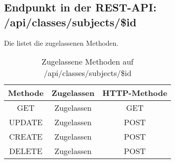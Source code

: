 \subsection{Endpunkt in der REST-API: /api/classes/subjects/\$id}
Die  listet die zugelassenen Methoden. 

\begin{table}[!htbp]
	\begin{tabular}{|c|c|c|}
		\hline
			\textbf{Methode} & \textbf{Zugelassen} & \textbf{HTTP-Methode} \\ \hline
			GET & Zugelassen & GET \\ \hline
			UPDATE & Zugelassen & POST \\ \hline 
			CREATE & Zugelassen & POST \\ \hline 
			DELETE & Zugelassen & POST \\ \hline
	\end{tabular}

		\caption{Zugelassene Methoden auf /api/classes/subjects/\$id}
		\label{tab:end:rest:api:classes:subjects:id:meth}
\end{table}